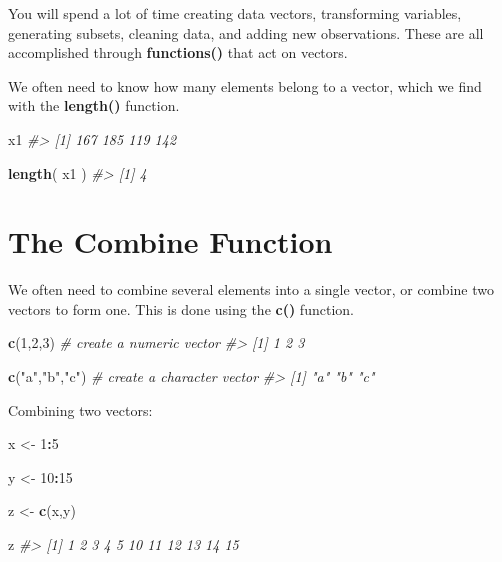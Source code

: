 \documentclass[]{book}
\newenvironment{Shaded}{\begin{snugshade}}{\end{snugshade}}
\newcommand{\CommentTok}[1]{\textcolor[rgb]{0.56,0.35,0.01}{\textit{#1}}}
\newcommand{\DecValTok}[1]{\textcolor[rgb]{0.00,0.00,0.81}{#1}}
\newcommand{\KeywordTok}[1]{\textcolor[rgb]{0.13,0.29,0.53}{\textbf{#1}}}
\newcommand{\NormalTok}[1]{#1}
\newcommand{\OperatorTok}[1]{\textcolor[rgb]{0.81,0.36,0.00}{\textbf{#1}}}
\newcommand{\StringTok}[1]{\textcolor[rgb]{0.31,0.60,0.02}{#1}}
\theoremstyle{definition}
\theoremstyle{definition}
\theoremstyle{definition}
\theoremstyle{remark}
\begin{document}
You will spend a lot of time creating data vectors, transforming
variables, generating subsets, cleaning data, and adding new
observations. These are all accomplished through \textbf{functions()}
that act on vectors.

We often need to know how many elements belong to a vector, which we
find with the \textbf{length()} function.

\begin{Shaded}
\begin{Highlighting}[]
\NormalTok{x1}
\CommentTok{#> [1] 167 185 119 142}

\KeywordTok{length}\NormalTok{( x1 )}
\CommentTok{#> [1] 4}
\end{Highlighting}
\end{Shaded}

\hypertarget{the-combine-function}{%
\section{The Combine Function}\label{the-combine-function}}

We often need to combine several elements into a single vector, or
combine two vectors to form one. This is done using the \textbf{c()}
function.

\begin{Shaded}
\begin{Highlighting}[]

\KeywordTok{c}\NormalTok{(}\DecValTok{1}\NormalTok{,}\DecValTok{2}\NormalTok{,}\DecValTok{3}\NormalTok{)        }\CommentTok{# create a numeric vector}
\CommentTok{#> [1] 1 2 3}

\KeywordTok{c}\NormalTok{(}\StringTok{"a"}\NormalTok{,}\StringTok{"b"}\NormalTok{,}\StringTok{"c"}\NormalTok{)  }\CommentTok{# create a character vector}
\CommentTok{#> [1] "a" "b" "c"}
\end{Highlighting}
\end{Shaded}

Combining two vectors:

\begin{Shaded}
\begin{Highlighting}[]

\NormalTok{x <-}\StringTok{ }\DecValTok{1}\OperatorTok{:}\DecValTok{5}

\NormalTok{y <-}\StringTok{ }\DecValTok{10}\OperatorTok{:}\DecValTok{15}

\NormalTok{z <-}\StringTok{ }\KeywordTok{c}\NormalTok{(x,y)}

\NormalTok{z}
\CommentTok{#>  [1]  1  2  3  4  5 10 11 12 13 14 15}
\end{Highlighting}
\end{Shaded}
\end{document}
